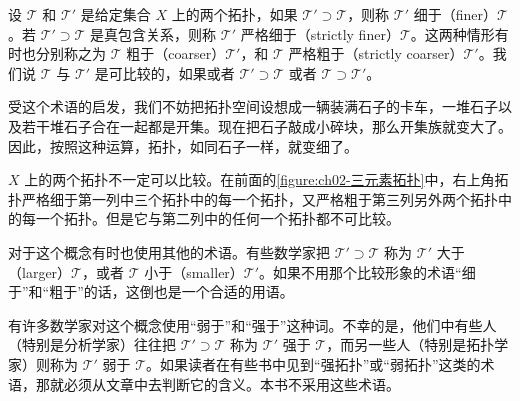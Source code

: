 \documentclass[../../main.tex]{subfiles}
\begin{document}
\begin{definition}[细于与粗于]\label{definition:ch02-细于粗于}
设 $\mathcal{T}$ 和 $\mathcal{T}'$ 是给定集合 $X$ 上的两个拓扑，如果 $\mathcal{T}' \supset \mathcal{T}$，则称 $\mathcal{T}'$ 细于（finer）$\mathcal{T}$。若 $\mathcal{T}' \supset \mathcal{T}$ 是真包含关系，则称 $\mathcal{T}'$ 严格细于（strictly finer）$\mathcal{T}$。这两种情形有时也分别称之为 $\mathcal{T}$ 粗于（coarser）$\mathcal{T}'$，和 $\mathcal{T}$ 严格粗于（strictly coarser）$\mathcal{T}'$。我们说 $\mathcal{T}$ 与 $\mathcal{T}'$ 是可比较的，如果或者 $\mathcal{T}' \supset \mathcal{T}$ 或者 $\mathcal{T} \supset \mathcal{T}'$。
\end{definition}

受这个术语的启发，我们不妨把拓扑空间设想成一辆装满石子的卡车，一堆石子以及若干堆石子合在一起都是开集。现在把石子敲成小碎块，那么开集族就变大了。因此，按照这种运算，拓扑，如同石子一样，就变细了。

$X$ 上的两个拓扑不一定可以比较。在前面的\cref{figure:ch02-三元素拓扑}中，右上角拓扑严格细于第一列中三个拓扑中的每一个拓扑，又严格粗于第三列另外两个拓扑中的每一个拓扑。但是它与第二列中的任何一个拓扑都不可比较。

对于这个概念有时也使用其他的术语。有些数学家把 $\mathcal{T}' \supset \mathcal{T}$ 称为 $\mathcal{T}'$ 大于（larger）$\mathcal{T}$，或者 $\mathcal{T}$ 小于（smaller）$\mathcal{T}'$。如果不用那个比较形象的术语“细于”和“粗于”的话，这倒也是一个合适的用语。

有许多数学家对这个概念使用“弱于”和“强于”这种词。不幸的是，他们中有些人（特别是分析学家）往往把 $\mathcal{T}' \supset \mathcal{T}$ 称为 $\mathcal{T}'$ 强于 $\mathcal{T}$，而另一些人（特别是拓扑学家）则称为 $\mathcal{T}'$ 弱于 $\mathcal{T}$。如果读者在有些书中见到“强拓扑”或“弱拓扑”这类的术语，那就必须从文章中去判断它的含义。本书不采用这些术语。
\end{document}
